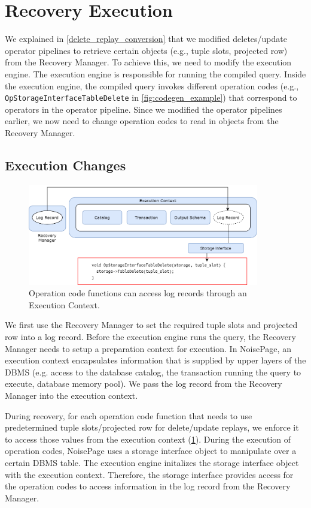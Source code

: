 \documentclass[12pt]{cmuthesis}
\begin{document}
\section{Recovery Execution}
We explained in \cref{delete_replay_conversion} that we modified deletes/update operator pipelines to retrieve certain objects (e.g., tuple slots, projected row) from the Recovery Manager. To achieve this, we need to modify the execution engine. The execution engine is responsible for running the compiled query. Inside the execution engine, the compiled query invokes different operation codes (e.g., \texttt{OpStorageInterfaceTableDelete} in \cref{fig:codegen_example}) that correspond to operators in the operator pipeline. Since we modified the operator pipelines earlier, we now need to change operation codes to read in objects from the Recovery Manager.

\subsection{Execution Changes}
\begin{figure}[t!]
\centering
\includegraphics[width=0.9\textwidth]{images/RecoveryExecution.png}
\caption{Operation code functions can access log records through an Execution Context.}
\label{fig:recovery_execution}
\end{figure}
 
We first use the Recovery Manager to set the required tuple slots and projected row into a log record. Before the execution engine runs the query, the Recovery Manager needs to setup a preparation context for execution. In NoisePage, an execution context encapsulates information that is supplied by upper layers of the DBMS (e.g. access to the database catalog, the transaction running the query to execute, database memory pool). We pass the log record from the Recovery Manager into the execution context.

During recovery, for each operation code function that needs to use predetermined tuple slots/projected row for delete/update replays, we enforce it to access those values from the execution context (\cref{fig:recovery_execution}). During the execution of operation codes, NoisePage uses a storage interface object to manipulate over a certain DBMS table. The execution engine initalizes the storage interface object with the execution context. Therefore, the storage interface provides access for the operation codes to access information in the log record from the Recovery Manager.
\end{document}

